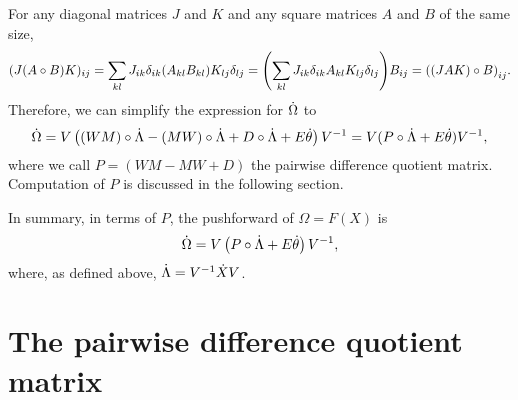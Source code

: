 \documentclass[../../main.tex]{subfiles}
\begin{document}
\begin{refsection}
	For any diagonal matrices $J$ and $K$ and any square matrices $A$ and $B$ of the same size,
	\begin{equation*}
		(J (A \circ B) K)_{ij}
		= \sum_{kl} J_{ik} \delta_{ik} \qty(A_{kl} B_{kl}) K_{lj} \delta_{lj}
		= \qty(\sum_{kl} J_{ik} \delta_{ik} A_{kl} K_{lj} \delta_{lj}) B_{ij}
		= \qty( \qty(JAK) \circ B )_{ij}.
	\end{equation*}
	Therefore, we can simplify the expression for $\dot{\Omega}$ to
	\begin{equation*}
		\dot{\Omega}
		= V \left( (W M) \circ \dot{\Lambda} - (M W) \circ \dot{\Lambda} + D \circ \dot{\Lambda} + E \dot{\theta} \right) V^{-1}
		= V (P \circ \dot{\Lambda} + E \dot{\theta}) V^{-1},
	\end{equation*}
	where we call $P = (W M - M W + D)$ the pairwise difference quotient matrix.
	Computation of $P$ is discussed in the following section.

	In summary, in terms of $P$, the pushforward of $\Omega = F(X)$ is
	\begin{equation}\label{powseries_pf}
		\dot{\Omega} = V \left( P \circ \dot{\Lambda} + E \dot{\theta} \right) V^{-1},
	\end{equation}
	where, as defined above, $\dot{\Lambda} = V^{-1} \dot{X} V$.

	\section{The pairwise difference quotient matrix}\label{the-pairwise-difference-quotient-matrix}


\end{refsection}
\end{document}
